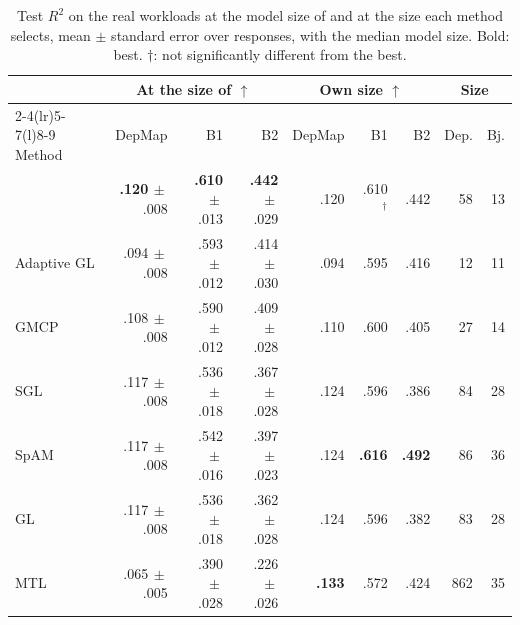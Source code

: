 \begin{table}[t]
\caption{Test $R^2$ on the real workloads at the model size of \sys{} and at the size each method selects, mean $\pm$ standard error over responses, with the median model size. Bold: best. $\dagger$: not significantly different from the best.}
\label{tab:real}
\centering
\scriptsize
\setlength{\tabcolsep}{1.3pt}
\begin{tabular*}{\columnwidth}{@{\extracolsep{\fill}}lrrrrrrrr@{}}
\toprule
& \multicolumn{3}{c}{At the size of \sys{} $\uparrow$} & \multicolumn{3}{c}{Own size $\uparrow$} & \multicolumn{2}{c}{Size}\\
\cmidrule(lr){2-4}\cmidrule(lr){5-7}\cmidrule(l){8-9}
Method & DepMap & B1 & B2 & DepMap & B1 & B2 & Dep. & Bj.\\
\midrule
\sys{} & \textbf{.120}{\tiny$\,\pm$.008} & \textbf{.610}{\tiny$\,\pm$.013} & \textbf{.442}{\tiny$\,\pm$.029} & .120 & .610$^\dagger$ & .442 & 58 & 13\\
Adaptive GL & .094{\tiny$\,\pm$.008} & .593{\tiny$\,\pm$.012} & .414{\tiny$\,\pm$.030} & .094 & .595 & .416 & 12 & 11\\
GMCP & .108{\tiny$\,\pm$.008} & .590{\tiny$\,\pm$.012} & .409{\tiny$\,\pm$.028} & .110 & .600 & .405 & 27 & 14\\
SGL & .117{\tiny$\,\pm$.008} & .536{\tiny$\,\pm$.018} & .367{\tiny$\,\pm$.028} & .124 & .596 & .386 & 84 & 28\\
SpAM & .117{\tiny$\,\pm$.008} & .542{\tiny$\,\pm$.016} & .397{\tiny$\,\pm$.023} & .124 & \textbf{.616} & \textbf{.492} & 86 & 36\\
GL & .117{\tiny$\,\pm$.008} & .536{\tiny$\,\pm$.018} & .362{\tiny$\,\pm$.028} & .124 & .596 & .382 & 83 & 28\\
MTL & .065{\tiny$\,\pm$.005} & .390{\tiny$\,\pm$.028} & .226{\tiny$\,\pm$.026} & \textbf{.133} & .572 & .424 & 862 & 35\\
\bottomrule
\end{tabular*}
\end{table}
